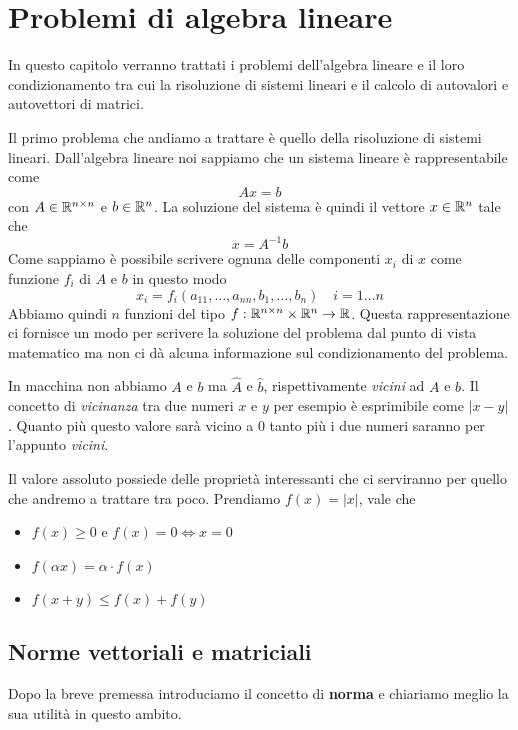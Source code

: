 \chapter{Problemi di algebra lineare}
In questo capitolo verranno trattati i problemi dell'algebra lineare e il loro condizionamento tra cui la
risoluzione di sistemi lineari e il calcolo di autovalori e autovettori di matrici.

Il primo problema che andiamo a trattare è quello della risoluzione di sistemi lineari. Dall'algebra lineare
noi sappiamo che un sistema lineare è rappresentabile come
\[ A x = b \]
con $A \in \mathbb{R}^{n \times n}$ e $b \in \mathbb{R}^n$. La soluzione del sistema è quindi il vettore $x \in \mathbb{R}^n$ tale che
\[ x = A^{-1} b \]
Come sappiamo è possibile scrivere ognuna delle componenti $x_i$ di $x$ come funzione $f_i$ di $A$ e $b$ in
questo modo
\[ x_i = f_i (a_{11}, \dots, a_{nn}, b_1, \dots, b_n) \quad i = 1 \dots n \]
Abbiamo quindi $n$ funzioni del tipo $f : \mathbb{R}^{n \times n} \times \mathbb{R}^n \to \mathbb{R}$. Questa rappresentazione ci
fornisce un modo per scrivere la soluzione del problema dal punto di vista matematico ma non ci dà alcuna
informazione sul condizionamento del problema.

In macchina non abbiamo $A$ e $b$ ma $\hat{A}$ e $\hat{b}$, rispettivamente \emph{vicini} ad $A$ e $b$. Il
concetto di \emph{vicinanza} tra due numeri $x$ e $y$ per esempio è esprimibile come $|x - y|$. Quanto più
questo valore sarà vicino a 0 tanto più i due numeri saranno per l'appunto \emph{vicini}.

Il valore assoluto possiede delle proprietà interessanti che ci serviranno per quello che andremo a trattare
tra poco. Prendiamo $f(x) = |x|$, vale che
\begin{itemize}
	\item $f(x) \geq 0$ e $f(x) = 0 \Leftrightarrow x = 0$
	\item $f(\alpha x) = \alpha \cdot f(x)$
	\item $f(x + y) \leq f(x) + f(y)$
\end{itemize}

\section{Norme vettoriali e matriciali}
Dopo la breve premessa introduciamo il concetto di \textbf{norma} e chiariamo meglio la sua utilità in questo
ambito.

